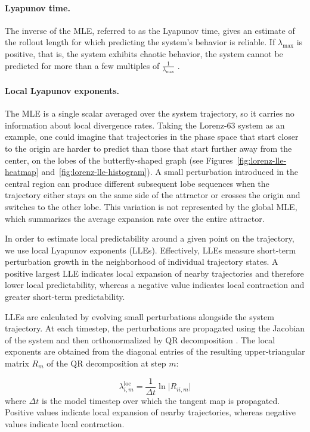 \documentclass{article}
\begin{document}
\paragraph{Lyapunov time.}
The inverse of the MLE, referred to as the Lyapunov time, gives an estimate of the rollout length for which predicting the system's behavior is reliable. If $\lambda_{\max}$ is positive, that is, the system exhibits chaotic behavior, the system cannot be predicted for more than a few multiples of $\frac{1}{\lambda_{\max}}$ \cite{strogatz_nonlinear_1994}.

\paragraph{Local Lyapunov exponents.}
The MLE is a single scalar averaged over the system trajectory, so it carries no information about local divergence rates. Taking the Lorenz-63 system as an example, one could imagine that trajectories in the phase space that start closer to the origin are harder to predict than those that start further away from the center, on the lobes of the butterfly-shaped graph (see Figures~\ref{fig:lorenz-lle-heatmap} and~\ref{fig:lorenz-lle-histogram}). A small perturbation introduced in the central region can produce different subsequent lobe sequences when the trajectory either stays on the same side of the attractor or crosses the origin and switches to the other lobe. This variation is not represented by the global MLE, which summarizes the average expansion rate over the entire attractor.

In order to estimate local predictability around a given point on the trajectory, we use local Lyapunov exponents (LLEs). Effectively, LLEs measure short-term perturbation growth in the neighborhood of individual trajectory states. A positive largest LLE indicates local expansion of nearby trajectories and therefore lower local predictability, whereas a negative value indicates local contraction and greater short-term predictability.

LLEs are calculated by evolving small perturbations alongside the system trajectory. At each timestep, the perturbations are propagated using the Jacobian of the system and then orthonormalized by QR decomposition \cite{benettin_lyapunov_1980, dieci_lyapunov_2002}. The local exponents are obtained from the diagonal entries of the resulting upper-triangular matrix $R_m$ of the QR decomposition at step $m$:

\begin{equation}
    \lambda^{\mathrm{loc}}_{i, m} = \frac{1}{\Delta t} \ln{\vert R_{ii, m} \vert}
\end{equation}
where $\Delta t$ is the model timestep over which the tangent map is propagated. Positive values indicate local expansion of nearby trajectories, whereas negative values indicate local contraction.
\end{document}

